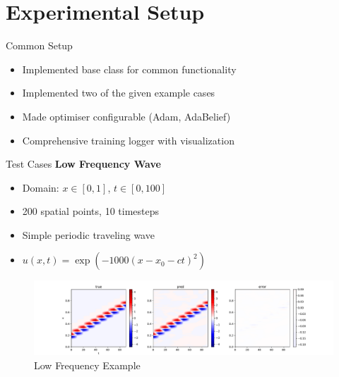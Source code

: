 \documentclass{beamer}
\begin{document}
\section{Experimental Setup}
\begin{frame}{Common Setup}
    \begin{itemize}
        \item Implemented base class for common functionality
        \item Implemented two of the given example cases
        \item Made optimiser configurable (Adam, AdaBelief)
        \item Comprehensive training logger with visualization
    \end{itemize}
\end{frame}

\begin{frame}{Test Cases}
    \textbf{Low Frequency Wave}
    \begin{itemize}
        \item Domain: $x \in [0,1]$, $t \in [0,100]$
        \item 200 spatial points, 10 timesteps
        \item Simple periodic traveling wave
        \item $u(x,t) = \exp(-1000(x-x_0-ct)^2)$
    \end{itemize}
    
    \begin{figure}
        \includegraphics[width=\textwidth]{functional/low-frequency-adam-20250206-1105-1/vis}
        \caption{Low Frequency Example}
    \end{figure}
\end{frame}
\end{document}
